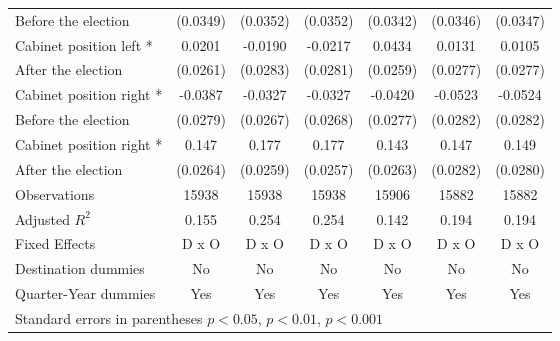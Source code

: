\begin{table}[htbp]
\begin{tabular}{l*{6}{c}}
 Before the election                    &    (0.0349)         &    (0.0352)         &    (0.0352)         &    (0.0342)         &    (0.0346)         &    (0.0347)         \\
[0,5em]
Cabinet position left * &      0.0201         &     -0.0190         &     -0.0217         &      0.0434         &      0.0131         &      0.0105         \\
After the election                    &    (0.0261)         &    (0.0283)         &    (0.0281)         &    (0.0259)         &    (0.0277)         &    (0.0277)         \\
[0,5em]
Cabinet position right *&     -0.0387         &     -0.0327         &     -0.0327         &     -0.0420         &     -0.0523         &     -0.0524         \\
 Before the election                    &    (0.0279)         &    (0.0267)         &    (0.0268)         &    (0.0277)         &    (0.0282)         &    (0.0282)         \\
[0,5em]
Cabinet position right *&       0.147\sym{***}&       0.177\sym{***}&       0.177\sym{***}&       0.143\sym{***}&       0.147\sym{***}&       0.149\sym{***}\\
 After the election                    &    (0.0264)         &    (0.0259)         &    (0.0257)         &    (0.0263)         &    (0.0282)         &    (0.0280)         \\
\hline
Observations        &       15938         &       15938         &       15938         &       15906         &       15882         &       15882         \\
Adjusted \(R^{2}\)  &       0.155         &       0.254         &       0.254         &       0.142         &       0.194         &       0.194         \\
Fixed Effects       &       D x O         &       D x O         &       D x O         &       D x O         &       D x O         &       D x O         \\
Destination dummies &          No         &          No         &          No         &          No         &          No         &          No         \\
Quarter-Year dummies&         Yes         &         Yes         &         Yes         &         Yes         &         Yes         &         Yes         \\
\hline\hline
\multicolumn{7}{l}{Standard errors in parentheses \sym{*} \(p<0.05\), \sym{**} \(p<0.01\), \sym{***} \(p<0.001\)}\\
\end{tabular}
\end{table}
